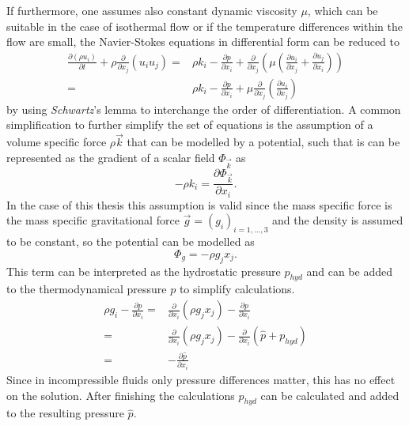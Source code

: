       If furthermore, one assumes also constant dynamic viscosity \(\mu\), which can be suitable in the case of isothermal flow or if the temperature differences within the flow are small, the Navier-Stokes equations in differential form can be reduced to 
      \begin{subequations}
        \label{eq:navierstokes}
      \begin{align}
        \frac{\partial \left(\rho u_i \right)}{\partial t} 
        + \rho \frac{\partial}{\partial x_j} \left( u_i  u_j \right) 
        =& \rho k_i
        - \frac{\partial p}{\partial x_i}
      + \frac{\partial}{\partial x_j} \left( \mu  \left( \frac{\partial u_i}{\partial x_j} 
      + \frac{\partial u_j}{\partial x_i} \right) \right) \\[0.5em]
        =& \rho k_i
        - \frac{\partial p}{\partial x_i}
        + \mu \frac{\partial}{\partial x_j} \left( \frac{\partial u_i}{\partial x_j} \right)
      \end{align}
    \end{subequations}
      by using \textit{Schwartz}'s lemma to interchange the order of differentiation. A common simplification to further simplify the set of equations is the assumption of a volume specific force \(\rho \vec{k}\) that can be modelled by a potential, such that is can be represented as the gradient of a scalar field \(\Phi_\vec{k}\) as
      \begin{displaymath}
       - \rho k_i = \frac{\partial \Phi_\vec{k}}{\partial x_i}.
      \end{displaymath}
      In the case of this thesis this assumption is valid since the mass specific force is the mass specific gravitational force \(\vec{g} = \left( g_i \right)_{i = 1,\dots,3}\) and the density is assumed to be constant, so the potential can be modelled as
      \begin{displaymath}
        \Phi_g = - \rho g_j x_j.
      \end{displaymath}
      This term can be interpreted as the hydrostatic pressure \(p_{hyd}\) and can be added to the thermodynamical pressure \(p\) to simplify calculations. 
      \begin{align}
        \rho g_i - \frac{\partial p}{\partial x_i} 
        =& \frac{\partial}{\partial x_i} \left( \rho g_j x_j \right) - \frac{\partial p}{\partial x_i} \nonumber \\[0.5em]
        =& \frac{\partial}{\partial x_i} \left( \rho g_j x_j \right) - \frac{\partial}{\partial x_i}  \left(\hat{p} + p_{hyd} \right) \nonumber \\[0.5em]
        =& - \frac{\partial \hat{p}}{\partial x_i}
      \end{align}
      Since in incompressible fluids only pressure differences matter, this has no effect on the solution. After finishing the calculations \(p_{hyd}\) can be calculated and added to the resulting pressure \(\hat{p}\).


